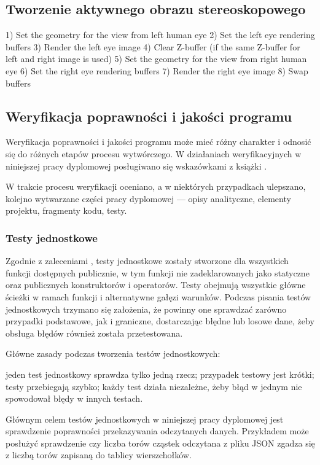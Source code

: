 \subsection{Tworzenie aktywnego obrazu stereoskopowego} 
1) Set the geometry for the view from left human eye 
2) Set the left eye rendering buffers 
3) Render the left eye image 
4) Clear Z-buffer (if the same Z-buffer for left and right image is used) 
5) Set the geometry for the view from right human eye 
6) Set the right eye rendering buffers 
7) Render the right eye image 
8) Swap buffers

\newpage
\subsection{Weryfikacja poprawności i jakości programu}
Weryfikacja poprawności i jakości programu może mieć różny charakter i odnosić się do różnych etapów procesu wytwórczego. W działaniach weryfikacyjnych w niniejszej pracy dyplomowej posługiwano się wskazówkami z książki \cite{specyfikacja}.

W trakcie procesu weryfikacji oceniano, a w niektórych przypadkach ulepszano, kolejno wytwarzane części pracy dyplomowej --- opisy analityczne, elementy projektu, fragmenty kodu, testy. 
\subsubsection{Testy jednostkowe}
Zgodnie z zaleceniami \cite{cleanCode}, testy jednostkowe zostały stworzone dla wszystkich funkcji dostępnych publicznie, w tym funkcji nie zadeklarowanych jako statyczne oraz publicznych konstruktorów i operatorów. Testy obejmują wszystkie główne ścieżki w ramach funkcji i alternatywne gałęzi warunków. Podczas pisania testów jednostkowych trzymano się założenia, że powinny one sprawdzać zarówno przypadki podstawowe, jak i graniczne, dostarczając błędne lub losowe dane, żeby obsługa błędów również została przetestowana.

Główne zasady podczas tworzenia testów jednostkowych:
\begin{itemize}
\itemi jeden test jednostkowy sprawdza tylko jedną rzecz;
\itemi przypadek testowy jest krótki;
\itemi testy przebiegają szybko;
\itemi każdy test działa niezależne, żeby błąd w jednym nie spowodował błędy w innych testach.
\end{itemize}

Głównym celem testów jednostkowych w niniejszej pracy dyplomowej jest sprawdzenie poprawności przekazywania odczytanych danych. Przykładem może posłużyć sprawdzenie czy liczba torów cząstek odczytana z pliku JSON zgadza się z liczbą torów zapisaną do tablicy wierszchołków.

